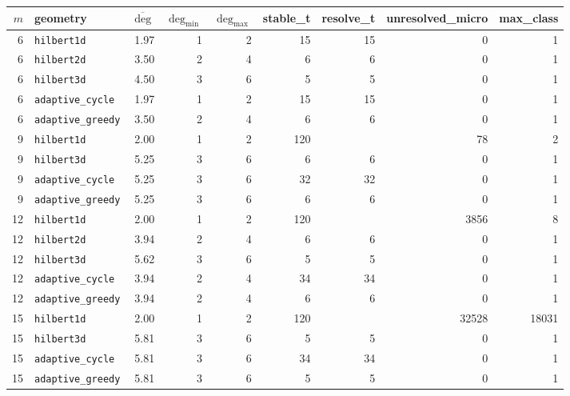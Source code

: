 \begin{tabular}{r l r r r r r r r}%
\hline%
$m$&geometry&$\overline{\deg}$&$\deg_{\min}$&$\deg_{\max}$&stable\_t&resolve\_t&unresolved\_micro&max\_class\\%
\hline%
6&\texttt{hilbert1d}&1.97&1&2&15&15&0&1\\%
6&\texttt{hilbert2d}&3.50&2&4&6&6&0&1\\%
6&\texttt{hilbert3d}&4.50&3&6&5&5&0&1\\%
6&\texttt{adaptive\_cycle}&1.97&1&2&15&15&0&1\\%
6&\texttt{adaptive\_greedy}&3.50&2&4&6&6&0&1\\%
9&\texttt{hilbert1d}&2.00&1&2&120&&78&2\\%
9&\texttt{hilbert3d}&5.25&3&6&6&6&0&1\\%
9&\texttt{adaptive\_cycle}&5.25&3&6&32&32&0&1\\%
9&\texttt{adaptive\_greedy}&5.25&3&6&6&6&0&1\\%
12&\texttt{hilbert1d}&2.00&1&2&120&&3856&8\\%
12&\texttt{hilbert2d}&3.94&2&4&6&6&0&1\\%
12&\texttt{hilbert3d}&5.62&3&6&5&5&0&1\\%
12&\texttt{adaptive\_cycle}&3.94&2&4&34&34&0&1\\%
12&\texttt{adaptive\_greedy}&3.94&2&4&6&6&0&1\\%
15&\texttt{hilbert1d}&2.00&1&2&120&&32528&18031\\%
15&\texttt{hilbert3d}&5.81&3&6&5&5&0&1\\%
15&\texttt{adaptive\_cycle}&5.81&3&6&34&34&0&1\\%
15&\texttt{adaptive\_greedy}&5.81&3&6&5&5&0&1\\%
\hline%
\end{tabular}
